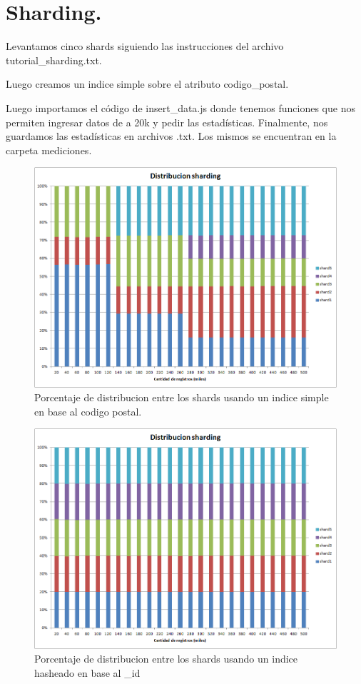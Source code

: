 \section{Sharding.}
Levantamos cinco shards siguiendo las instrucciones del archivo tutorial\_sharding.txt.

Luego creamos un indice simple sobre el atributo codigo\_postal.

Luego importamos el código de insert\_data.js donde tenemos
funciones que nos permiten ingresar datos de a 20k y pedir las estadísticas.
Finalmente, nos guardamos las estadísticas en archivos .txt. Los mismos se encuentran en
la carpeta mediciones.

\begin{figure}[H]
\centering
\includegraphics[width=165mm]{../mediciones/sharding_simple.png}
\caption{Porcentaje de distribucion entre los shards usando un
indice simple en base al codigo postal.}
\end{figure}

\begin{figure}[H]
\centering
\includegraphics[width=165mm]{../mediciones/sharding_hashed.png}
\caption{Porcentaje de distribucion entre los shards usando un
indice hasheado en base al \_id}
\end{figure}


